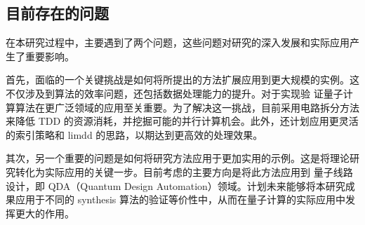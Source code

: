 \subsection{目前存在的问题}
在本研究过程中，主要遇到了两个问题，这些问题对研究的深入发展和实际应用产生了重要影响。


首先，面临的一个关键挑战是如何将所提出的方法扩展应用到更大规模的实例。这不仅涉及到算法的效率问题，还包括数据处理能力的提升。对于实现验
证量子计算算法在更广泛领域的应用至关重要。为了解决这一挑战，目前采用电路拆分方法来降低 TDD 的资源消耗，并挖掘可能的并行计算机会。此外，还计划应用更灵活的索引策略和 limdd 的思路，以期达到更高效的处理效果。

其次，另一个重要的问题是如何将研究方法应用于更加实用的示例。这是将理论研究转化为实际应用的关键一步。目前考虑的主要方向是将此方法应用到
量子线路设计，即 QDA（Quantum Design Automation）领域。计划未来能够将本研究成果应用于不同的 synthesis 算法的验证等价性中，从而在量子计算的实际应用中发挥更大的作用。